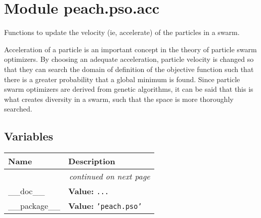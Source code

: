 %
%
%


\section{Module peach.pso.acc}

    \label{peach:pso:acc}

Functions to update the velocity (ie, accelerate) of the particles in a swarm.

Acceleration of a particle is an important concept in the theory of particle
swarm optimizers. By choosing an adequate acceleration, particle velocity is
changed so that they can search the domain of definition of the objective
function such that there is a greater probability that a global minimum is
found. Since particle swarm optimizers are derived from genetic algorithms, it
can be said that this is what creates diversity in a swarm, such that the space
is more thoroughly searched.


  \subsection{Variables}

    \vspace{-1cm}
\hspace{\varindent}\begin{longtable}{|p{\varnamewidth}|p{\vardescrwidth}|l}
\cline{1-2}
\cline{1-2} \centering \textbf{Name} & \centering \textbf{Description}& \\
\cline{1-2}
\endhead\cline{1-2}\multicolumn{3}{r}{\small\textit{continued on next page}}\\\endfoot\cline{1-2}
\endlastfoot\raggedright \_\-\_\-d\-o\-c\-\_\-\_\- & \raggedright \textbf{Value:} 
{\tt \texttt{...}}&\\
\cline{1-2}
\raggedright \_\-\_\-p\-a\-c\-k\-a\-g\-e\-\_\-\_\- & \raggedright \textbf{Value:} 
{\tt \texttt{'}\texttt{peach.pso}\texttt{'}}&\\
\cline{1-2}
\end{longtable}


